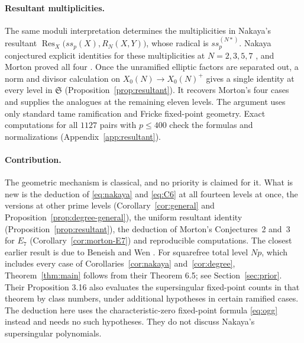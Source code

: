 \documentclass[11pt,a4paper]{article}
\theoremstyle{remark}\newtheorem{remark}[theorem]{Remark}
\numberwithin{equation}{section}
\begin{document}
	\paragraph{Resultant multiplicities.}
	The same moduli interpretation determines the multiplicities in Nakaya's resultant $\operatorname{Res}_X\bigl(ss_p(X),R_N(X,Y)\bigr)$, whose radical is $ss_p^{(N*)}$. Nakaya conjectured explicit identities for these multiplicities at $N=2,3,5,7$ \cite[Conjecture~4]{Nakaya}, and Morton proved all four \cite[Theorems~1, 3 and~5]{MortonFricke}. Once the unramified elliptic factors are separated out, a norm and divisor calculation on $X_0(N)\to X_0(N)^+$ gives a single identity at every level in $\mathfrak S$ (Proposition~\ref{prop:resultant}). It recovers Morton's four cases and supplies the analogues at the remaining eleven levels. The argument uses only standard tame ramification and Fricke fixed-point geometry. Exact computations for all $1127$ pairs with $p\le400$ check the formulas and normalizations (Appendix~\ref{app:resultant}).
	
	
	
	\paragraph{Contribution.}
	The geometric mechanism is classical, and no priority is claimed for it. What is new is the deduction of \eqref{eq:nakaya} and \eqref{eq:C6} at all fourteen levels at once, the versions at other prime levels (Corollary~\ref{cor:general} and Proposition~\ref{prop:degree-general}), the uniform resultant identity (Proposition~\ref{prop:resultant}), the deduction of Morton's Conjectures~2 and~3 for $E_7$ (Corollary~\ref{cor:morton-E7}) and reproducible computations. The closest earlier result is due to Beneish and Wen \cite{BW}. For squarefree total level $Np$, which includes every case of Corollaries~\ref{cor:nakaya} and~\ref{cor:degree}, Theorem~\ref{thm:main} follows from their Theorem 6.5; see Section~\ref{sec:prior}. Their Proposition 3.16 also evaluates the supersingular fixed-point counts in that theorem by class numbers, under additional hypotheses in certain ramified cases. The deduction here uses the characteristic-zero fixed-point formula \eqref{eq:ogg} instead and needs no such hypotheses. They do not discuss Nakaya's supersingular polynomials.
	
\end{document}
